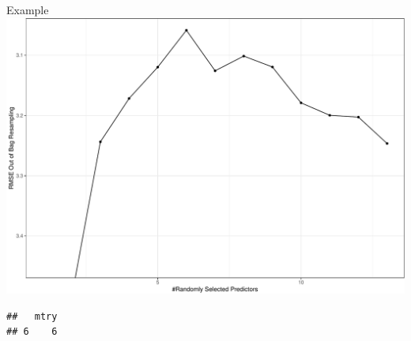 \documentclass[
  ignorenonframetext,
]{beamer}
\newenvironment{Shaded}{\begin{snugshade}}{\end{snugshade}}
\newcommand{\NormalTok}[1]{#1}
\newcommand{\SpecialCharTok}[1]{\textcolor[rgb]{0.00,0.00,0.00}{#1}}
\begin{document}
\begin{frame}[fragile]
\begin{block}{Example}
\includegraphics{L7_files/figure-beamer/unnamed-chunk-7-1.pdf}

\begin{Shaded}
\end{Shaded}

\begin{verbatim}
##   mtry
## 6    6
\end{verbatim}
\end{block}
\end{frame}
\end{document}
